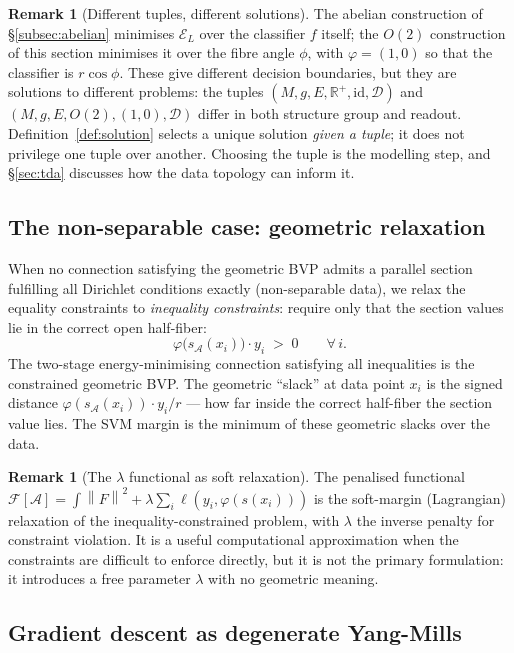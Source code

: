 \documentclass[11pt, a4paper]{article}
\theoremstyle{plain}
\theoremstyle{definition}
\newtheorem{remark}[theorem]{Remark}
\newcommand{\R}{\mathbb{R}}
\newcommand{\Sig}{\mathcal{A}}
\newcommand{\norm}[1]{\left\|#1\right\|}
\begin{document}
\begin{remark}[Different tuples, different solutions]\label{rem:tuple-dependence}
The abelian construction of \S\ref{subsec:abelian} minimises $\mathcal{E}_L$ over
the classifier $f$ itself; the $O(2)$ construction of this section minimises it
over the fibre angle $\phi$, with $\varphi = (1,0)$ so that the classifier is
$r\cos\phi$. These give different decision boundaries, but they are solutions to
different problems: the tuples
$(M,g,E,\R^+,\mathrm{id},\mathcal{D})$ and $(M,g,E,O(2),(1,0),\mathcal{D})$
differ in both structure group and readout. Definition~\ref{def:solution} selects
a unique solution \emph{given a tuple}; it does not privilege one tuple over
another. Choosing the tuple is the modelling step, and \S\ref{sec:tda} discusses
how the data topology can inform it.
\end{remark}

\subsection{The non-separable case: geometric relaxation}
\label{subsec:nonsep}

When no connection satisfying the geometric BVP admits a parallel section
fulfilling all Dirichlet conditions exactly
(non-separable data), we relax the equality constraints to \emph{inequality
constraints}: require only that the section values lie in the correct
open half-fiber:
\[
  \varphi\bigl(s_\Sig(x_i)\bigr) \cdot y_i \;>\; 0 \qquad \forall\,i.
\]
The two-stage energy-minimising connection satisfying all inequalities is the constrained
geometric BVP. The geometric ``slack'' at data point $x_i$ is the signed
distance $\varphi(s_\Sig(x_i)) \cdot y_i / r$ --- how far inside the correct
half-fiber the section value lies. The SVM margin is the minimum of these
geometric slacks over the data.

\begin{remark}[The $\lambda$ functional as soft relaxation]
The penalised functional $\mathcal{F}[\Sig] = \int\norm{F}^2 + \lambda\sum_i
\ell(y_i,\varphi(s(x_i)))$ is the soft-margin (Lagrangian) relaxation of the
inequality-constrained problem, with $\lambda$ the inverse penalty for constraint
violation. It is a useful computational approximation when the constraints are
difficult to enforce directly, but it is not the primary formulation: it
introduces a free parameter $\lambda$ with no geometric meaning.
\end{remark}

\subsection{Gradient descent as degenerate Yang-Mills}
\label{subsec:backprop}
\end{document}
